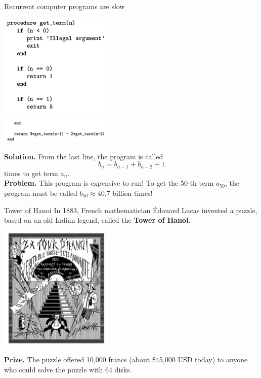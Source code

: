\documentclass[10pt]{beamer}
\begin{document}
\begin{frame}{Recurrent computer programs are slow}

    \begin{center}
 \includegraphics[width=0.4\textwidth]{images/recurrence_program_1} 
    	\vspace{-.1cm} \\
 \includegraphics[width=0.4\textwidth]{images/recurrence_program_2} 
     \end{center} 
 \vfill  
\colorbox{green!30}{\textbf{Solution.}} 
From the last line, the program is called
\[ b_n = b_{n-1} + b_{n-2} + 1\]
times to get term $a_n$. \\
\vfill \pause 
\colorbox{red!30}{\textbf{Problem.}} This program is expensive to run! To get the 50-th term $a_{50}$, the program must be called $b_{50} \approx 40.7$ billion times!
 
\end{frame}

\begin{frame}{Tower of Hanoi}
In 1883, French mathematician \'{E}douard Lucas invented a puzzle, based on an old Indian legend, called the \textbf{Tower of Hanoi}.

   \begin{center}
 \includegraphics[width=0.4\textwidth]{images/tower_of_hanoi_cover}
   \end{center}

\vfill 
\colorbox{green!30}{\textbf{Prize.}} 
The puzzle offered 10,000 francs (about \$45,000 USD today) to anyone who could solve the puzzle with 64 disks. 

\end{frame}
\end{document}
